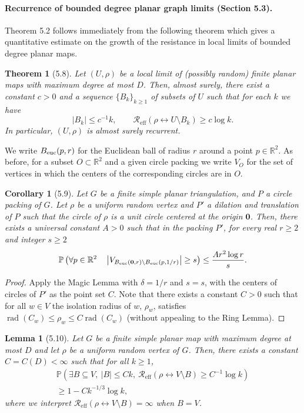\documentclass[UTF8,11pt]{ctexart}
\newtheorem*{theorem}{Theorem}
\newtheorem*{lemma}{Lemma}
\newtheorem*{corollary}{Corollary}
\theoremstyle{definition}
\newcommand{\R}{\mathbb R}
\newcommand{\Prob}{\mathbb P}
\newcommand{\Reff}{\mathcal R_{\mathrm{eff}}}
\begin{document}
\paragraph{Recurrence of bounded degree planar graph limits (Section 5.3).}
Theorem 5.2 follows immediately from the following theorem which gives a quantitative estimate on the growth of the resistance in local limits of bounded degree planar maps.
\begin{theorem}[5.8]
Let $(U,\rho)$ be a local limit of (possibly random) finite planar maps with maximum degree at most $D$. Then, almost surely, there exist a constant $c>0$ and a sequence $\{B_k\}_{k\ge1}$ of subsets of $U$ such that for each $k$ we have
\[
|B_k|\le c^{-1}k,\qquad \Reff(\rho\leftrightarrow U\setminus B_k)\ge c\log k.
\]
In particular, $(U,\rho)$ is almost surely recurrent.
\end{theorem}
We write $B_{\rm euc}(p,r)$ for the Euclidean ball of radius $r$ around a point $p\in\R^2$. As before, for a subset $O\subset\R^2$ and a given circle packing we write $V_O$ for the set of vertices in which the centers of the corresponding circles are in $O$.
\begin{corollary}[5.9]
Let $G$ be a finite simple planar triangulation, and $P$ a circle packing of $G$. Let $\rho$ be a uniform random vertex and $P'$ a dilation and translation of $P$ such that the circle of $\rho$ is a unit circle centered at the origin $\mathbf0$. Then, there exists a universal constant $A>0$ such that in the packing $P'$, for every real $r\ge2$ and integer $s\ge2$
\[
\Prob\left(\forall p\in\R^2\quad\left|V_{B_{\rm euc}(\mathbf0,r)\setminus B_{\rm euc}(p,1/r)}\right|\ge s\right)\le\frac{Ar^2\log r}{s}.
\]
\end{corollary}
\begin{proof}
Apply the Magic Lemma with $\delta=1/r$ and $s=s$, with the centers of circles of $P'$ as the point set $C$. Note that there exists a constant $C>0$ such that for all $w\in V$ the isolation radius of $w$, $\rho_w$, satisfies $\operatorname{rad}(C_w)\le\rho_w\le C\operatorname{rad}(C_w)$ (without appealing to the Ring Lemma).
\end{proof}
\begin{lemma}[5.10]
Let $G$ be a finite simple planar map with maximum degree at most $D$ and let $\rho$ be a uniform random vertex of $G$. Then, there exists a constant $C=C(D)<\infty$ such that for all $k\ge1$,
\begin{multline*}
\Prob\left(\exists B\subseteq V,\ |B|\le Ck,\ \Reff(\rho\leftrightarrow V\setminus B)\ge C^{-1}\log k\right)\\
\ge1-Ck^{-1/3}\log k,
\end{multline*}
where we interpret $\Reff(\rho\leftrightarrow V\setminus B)=\infty$ when $B=V$.
\end{lemma}
\end{document}
